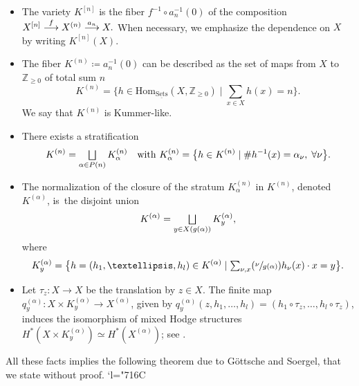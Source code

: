 \documentclass[11pt]{article}
\let\ts\textstyle
\newcommand{\Psfrac}[2]{(\sfrac{#1}{#2})}
\newcommand{\To}[1]{\mathchoice{\xrightarrow{\textstyle\kern4pt#1\kern3pt}}{\stackrel{#1}{\longrightarrow}}{}{}}
\let\oldbigsqcup\bigsqcup
\renewcommand{\bigsqcup}{\mathop{\textstyle\oldbigsqcup}\displaylimits}
\newcommand{\Changelback}{\mathcode`l="716C}
\theoremstyle{definition}
\newcommand{\ZZ}{\mathbb{Z}}
\begin{document}
\begin{itemize}
\item The variety $K^{[n]}$ is the fiber $f^{-1} \circ a^{-1}_n(0)$ of the composition
$
X^{[n]} \To{f} X^{(n)} \To{a_n} X.
$
When necessary, we emphasize the dependence on $X$ by writing $K^{[n]}(X)$.
\item The fiber $K^{(n)} \coloneqq a_n^{-1}(0)$ can be described as the set of maps from $X$ to $\ZZ_{\geq 0}$ of total sum $n$
\[
K^{(n)} = \big\{ h \in \mathrm{Hom}_{\underline{\mathrm{Sets}}}(X, \ZZ_{\geq 0}) \mid\ts\sum_{x \in X} h(x)=n \big\}.
\]
We say that $K^{(n)}$ is Kummer-like.
\item There exists a stratification
\[
K^{(n)} = \bigsqcup_{\alpha \in P(n)} K^{(n)}_{\alpha}\quad \text{with }
K^{(n)}_{\alpha} = \big\{ h \in K^{(n)} \mid  \# h^{-1}(x)= \alpha_{\nu},\; \forall \nu \big\}.
\]
\item The normalization of the closure of the stratum $K^{(n)}_{\alpha}$ in $K^{(n)}$, denoted $K^{(\alpha)}$, is~the disjoint union
\[
K^{(\alpha)}= \bigsqcup_{y \in X(g(\alpha))} K^{(\alpha)}_y,
\]
where
\[
K^{(\alpha)}_y = \big\{ h =(h_1, \ldots, h_l) \in K^{(\alpha)} \mid  \ts\sum_{\nu, x} \Psfrac{\nu}{g(\alpha)}h_{\nu}(x) \cdot x=y\big\}.
\]
\item Let $\tau_{z}\colon X \to X$ be the translation by $z \in X$. The finite map $q^{(\alpha)}_y\colon X \times K^{(\alpha)}_y \to X^{(\alpha)}$, given by $q^{(\alpha)}_y(z, h_1,\ldots, h_l)=(h_1 \circ \tau_z, \ldots, h_l \circ \tau_z)$, induces the isomorphism of mixed Hodge structures $H^*(X \times K^{(\alpha)}_y) \simeq H^*(X^{(\alpha)})$; see \cite[p.\,243]{GottscheSoergel93}.
\end{itemize}
All these facts implies the following theorem due to Göttsche and Soergel, that we state without proof.
\Changelback
\end{document}
